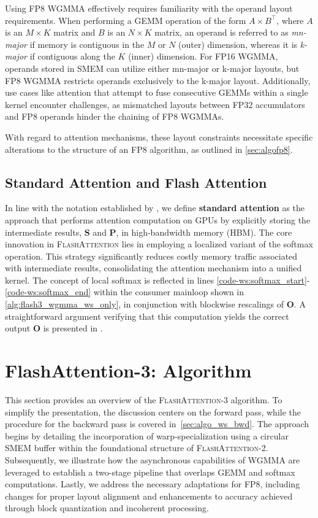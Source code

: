 \begin{enumerate}
Using FP8 WGMMA effectively requires familiarity with the operand layout requirements. When performing a GEMM operation of the form $A \times B^{\top}$, where $A$ is an $M\times K$ matrix and $B$ is an $N\times K$ matrix, an operand is referred to as \emph{mn-major} if memory is contiguous in the $M$ or $N$ (outer) dimension, whereas it is \emph{k-major} if contiguous along the $K$ (inner) dimension. For FP16 WGMMA, operands stored in SMEM can utilize either mn-major or k-major layouts, but FP8 WGMMA restricts operands exclusively to the k-major layout. Additionally, use cases like attention that attempt to fuse consecutive GEMMs within a single kernel encounter challenges, as mismatched layouts between FP32 accumulators and FP8 operands hinder the chaining of FP8 WGMMAs.

With regard to attention mechanisms, these layout constraints necessitate specific alterations to the structure of an FP8 algorithm, as outlined in \cref{sec:algofp8}.

\subsection{Standard Attention and Flash Attention} In line with the notation established by \citet{dao2022flashattention}, we define \textbf{standard attention} as the approach that performs attention computation on GPUs by explicitly storing the intermediate results, $\mathbf{S}$ and $\mathbf{P}$, in high-bandwidth memory (HBM). The core innovation in \textsc{FlashAttention} lies in employing a localized variant of the softmax operation. This strategy significantly reduces costly memory traffic associated with intermediate results, consolidating the attention mechanism into a unified kernel. The concept of local softmax is reflected in lines \ref{code-ws:softmax_start}-\ref{code-ws:softmax_end} within the consumer mainloop shown in \cref{alg:flash3_wgmma_ws_only}, in conjunction with blockwise rescalings of $\mathbf{O}$. A straightforward argument verifying that this computation yields the correct output $\mathbf{O}$ is presented in \cite[\S 2.3.1]{dao2023flashattention2}.

\section{FlashAttention-3: Algorithm}
\label{sec:algo}

This section provides an overview of the \textsc{FlashAttention-3} algorithm. To simplify the presentation, the discussion centers on the forward pass, while the procedure for the backward pass is covered in~\cref{sec:algo_ws_bwd}. The approach begins by detailing the incorporation of warp-specialization using a circular SMEM buffer within the foundational structure of \textsc{FlashAttention-2}. Subsequently, we illustrate how the asynchronous capabilities of WGMMA are leveraged to establish a two-stage pipeline that overlaps GEMM and softmax computations. Lastly, we address the necessary adaptations for FP8, including changes for proper layout alignment and enhancements to accuracy achieved through block quantization and incoherent processing.


\end{enumerate}
